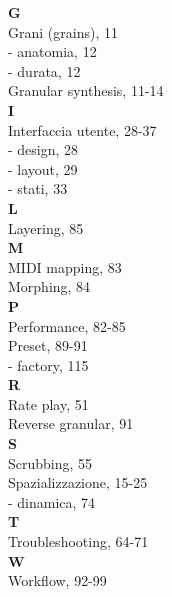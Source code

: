\documentclass[a4paper,11pt,openany]{book}
\begin{document}
\begin{multicols}{2}
\textbf{G}\\
Grani (grains), 11\\
- anatomia, 12\\
- durata, 12\\
Granular synthesis, 11-14\\

\textbf{I}\\
Interfaccia utente, 28-37\\
- design, 28\\
- layout, 29\\
- stati, 33\\

\textbf{L}\\
Layering, 85\\

\textbf{M}\\
MIDI mapping, 83\\
Morphing, 84\\

\textbf{P}\\
Performance, 82-85\\
Preset, 89-91\\
- factory, 115\\

\textbf{R}\\
Rate play, 51\\
Reverse granular, 91\\

\textbf{S}\\
Scrubbing, 55\\
Spazializzazione, 15-25\\
- dinamica, 74\\

\textbf{T}\\
Troubleshooting, 64-71\\

\textbf{W}\\
Workflow, 92-99\\
\end{multicols}
\end{document}
